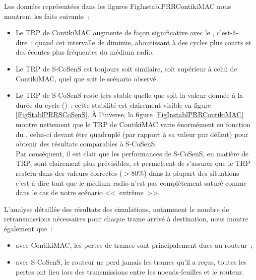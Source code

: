 Les données représentées dans les figures 
{FigInstablPRRContikiMAC} nous montrent les faits suivants~:

\begin{itemize}

\item Le TRP de ContikiMAC augmente de façon significative avec le
, c'est-à-dire~: quand cet intervalle de
 diminue, aboutissant à des cycles plus courts
et des écoutes plus fréquentes du médium radio.

\item Le TRP de S-CoSenS est toujours soit similaire, soit supérieur
à celui de ContikiMAC, quel que soit le scénario observé.

\item Le TRP de S-CoSenS reste très stable quelle que soit la valeur
donnée à la durée du cycle ()~: cette stabilité est
clairement visible en figure \vref{FigStablPRRSCoSenS}. À l'inverse,
la figure \vref{FigInstablPRRContikiMAC} montre nettement que le TRP
de ContikiMAC varie énormément en fonction du ,
celui-ci devant être quadruplé (par rapport à sa valeur par défaut)
pour obtenir des résultats comparables à S-CoSenS.\\
Par conséquent, il est clair que les performances de S-CoSenS, en
matière de TRP, sont clairement plus prévisibles, et permettent de
s'assurer que le TRP restera dans des valeurs correctes ($> 80\%$)
dans la plupart des situations~--- c'est-à-dire tant que le médium
radio n'est pas complètement saturé comme dans le cas de notre
scénario <<~extrême~>>.

\end{itemize}

L'analyse détaillée des résultats des simulations, notamment le nombre
de retransmissions nécessaires pour chaque trame arrivé à destination,
nous montre également que~:

\begin{itemize}

\item avec ContikiMAC, les pertes de trames sont principalement dues
au routeur~;

\item avec S-CoSenS, le routeur ne perd jamais les trames qu'il a
reçus, toutes les pertes ont lieu lors des transmissions entre les
noeuds-feuilles et le routeur.

\end{itemize}

